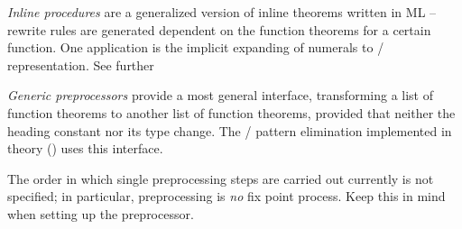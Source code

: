 \begin{isabellebody}
\begin{isamarkuptext}
  \emph{Inline procedures} are a generalized version of inline
  theorems written in ML -- rewrite rules are generated dependent
  on the function theorems for a certain function.  One
  application is the implicit expanding of  numerals
  to  /  representation.  See further

  \emph{Generic preprocessors} provide a most general interface,
  transforming a list of function theorems to another
  list of function theorems, provided that neither the heading
  constant nor its type change.  The  / 
  pattern elimination implemented in
  theory  () uses this
  interface.

  \begin{warn}
    The order in which single preprocessing steps are carried
    out currently is not specified; in particular, preprocessing
    is \emph{no} fix point process.  Keep this in mind when
    setting up the preprocessor.


\end{warn}
\end{isamarkuptext}
\end{isabellebody}
